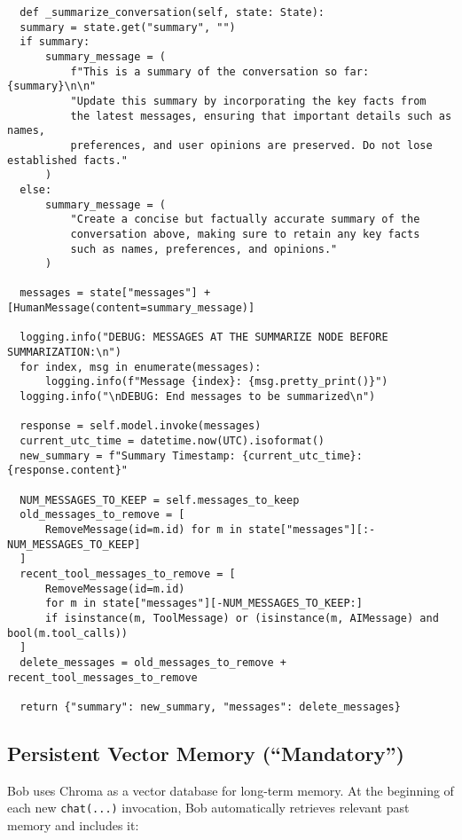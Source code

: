 \documentclass[conference]{IEEEtran}
\begin{document}
\begin{verbatim}
  def _summarize_conversation(self, state: State):
  summary = state.get("summary", "")
  if summary:
      summary_message = (
          f"This is a summary of the conversation so far: {summary}\n\n"
          "Update this summary by incorporating the key facts from 
          the latest messages, ensuring that important details such as names, 
          preferences, and user opinions are preserved. Do not lose established facts."
      )
  else:
      summary_message = (
          "Create a concise but factually accurate summary of the 
          conversation above, making sure to retain any key facts 
          such as names, preferences, and opinions."
      )

  messages = state["messages"] + [HumanMessage(content=summary_message)]

  logging.info("DEBUG: MESSAGES AT THE SUMMARIZE NODE BEFORE SUMMARIZATION:\n")
  for index, msg in enumerate(messages):
      logging.info(f"Message {index}: {msg.pretty_print()}")
  logging.info("\nDEBUG: End messages to be summarized\n")

  response = self.model.invoke(messages)
  current_utc_time = datetime.now(UTC).isoformat()
  new_summary = f"Summary Timestamp: {current_utc_time}: {response.content}"

  NUM_MESSAGES_TO_KEEP = self.messages_to_keep
  old_messages_to_remove = [
      RemoveMessage(id=m.id) for m in state["messages"][:-NUM_MESSAGES_TO_KEEP]
  ]
  recent_tool_messages_to_remove = [
      RemoveMessage(id=m.id)
      for m in state["messages"][-NUM_MESSAGES_TO_KEEP:]
      if isinstance(m, ToolMessage) or (isinstance(m, AIMessage) and bool(m.tool_calls))
  ]
  delete_messages = old_messages_to_remove + recent_tool_messages_to_remove

  return {"summary": new_summary, "messages": delete_messages}

\end{verbatim}

\subsection{Persistent Vector Memory (“Mandatory”)}
Bob uses Chroma as a vector database for long-term memory. 
At the beginning of each new \texttt{chat(...)} invocation, 
Bob automatically retrieves relevant past memory and includes it:
\end{document}
